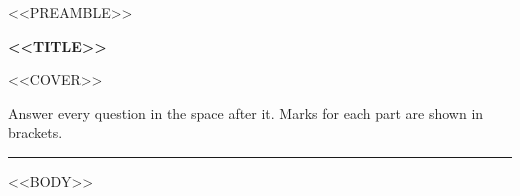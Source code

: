 <<PREAMBLE>>



{\Large\bfseries <<TITLE>>\par}
\smallskip
<<COVER>>\par
Answer every question in the space after it. Marks for each part are shown in brackets.\par
\medskip
{\color{gray}\hrule}
\bigskip

<<BODY>>


